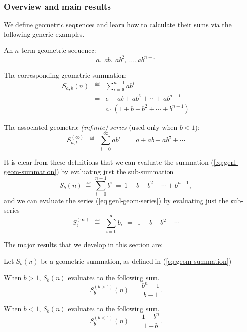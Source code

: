 \subsubsection{Overview and main results}

We define geometric sequences and learn how to calculate their sums
via the following generic examples.

An $n$-term geometric sequence:
\begin{equation}
\label{eq:genl-geom-seq}
a, \ ab, \ ab^2, \ \ldots, ab^{n-1}
\end{equation}

The corresponding geometric summation:
\begin{eqnarray}
\label{eq:genl-geom-summation}
S_{a,b}(n)
 & \eqdef &  \sum_{i=0}^{n-1} a b^i \\
\nonumber
 & = &  a + ab + ab^2 + \cdots + ab^{n-1} \\
\nonumber
 & = & 
 a \cdot (1+ b + b^2 + \cdots + b^{n-1})
\end{eqnarray}

The associated geometric {\em (infinite) series} (used only when $b < 1$):
\begin{equation}
\label{eq:genl-geom-series}
S_{a,b}^{(\infty)} \ \ \eqdef \ \  \sum_{i=0}^\infty a b^i
 \ \  = \ \   a + ab + ab^2 + \cdots 
\end{equation}

It is clear from these definitions that we can evaluate the summation
(\ref{eq:genl-geom-summation}) by evaluating just the sub-summation
\begin{equation}
\label{eq:geom-summation}
S_{b}(n) \ \eqdef \ \sum_{i=0}^{n-1} b^i \ = \
1+ b + b^2 + \cdots + b^{n-1},
\end{equation}
and we can evaluate the series (\ref{eq:genl-geom-series}) by
evaluating just the sub-series
\begin{equation}
\label{eq:geom-series}
S_{b}^{(\infty)} \ \ \eqdef \ \ \sum_{i=0}^\infty b_i \ \ = \ \
1+ b + b^2 + \cdots 
\end{equation}

\medskip

The major results that we develop in this section are:

\begin{prop}
\label{thm:sum-finite-geometric-series}
Let $S_{b}(n)$ be a geometric summation, as defined in
(\ref{eq:geom-summation}).

When $b > 1$, $S_{b}(n)$ evaluates to the following sum.
\begin{equation}
\label{eq:geom-sum:b>1}
S^{(b>1)}_{b}(n) \ = \ \frac{b^{n}- 1}{b - 1}.
\end{equation}

When $b < 1$, $S_{b}(n)$ evaluates to the following sum.
\begin{equation}
\label{eq:geom-sum:b<1}
S^{(b<1)}_{b}(n) \ = \ \frac{1 - b^n}{1-b}.
\end{equation}
\end{prop}

